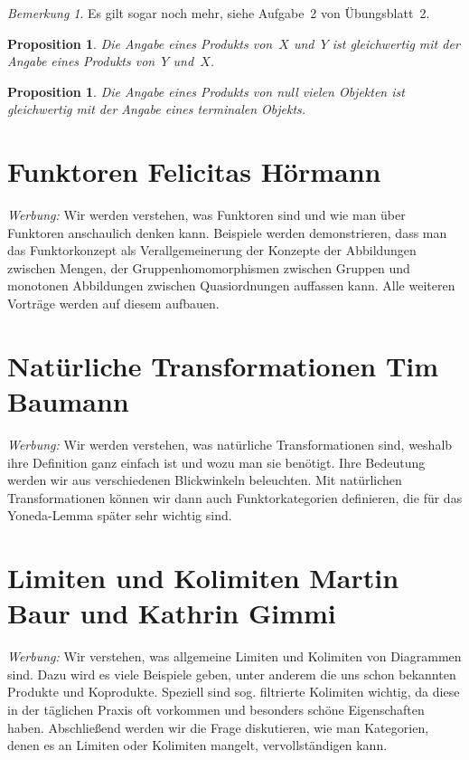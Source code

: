 \documentclass[a4paper,ngerman]{scrartcl}
\theoremstyle{definition}
\theoremstyle{plain}
\newtheorem{prop}[defn]{Proposition}
\theoremstyle{remark}
\newtheorem{bem}[defn]{Bemerkung}
\begin{document}
\begin{bem}Es gilt sogar noch mehr, siehe Aufgabe~2 von Übungsblatt~2.\end{bem}

\begin{prop}Die Angabe eines Produkts von~$X$ und~$Y$ ist gleichwertig mit der
Angabe eines Produkts von~$Y$ und~$X$.\end{prop}

\begin{prop}Die Angabe eines Produkts von null vielen Objekten ist gleichwertig
mit der Angabe eines terminalen Objekts.\end{prop}


\section[Funktoren]{Funktoren \hfill \small Felicitas Hörmann}

\emph{Werbung:} Wir werden verstehen, was Funktoren sind und wie man über
Funktoren anschaulich denken kann. Beispiele werden demonstrieren, dass
man das Funktorkonzept als Verallgemeinerung der Konzepte der Abbildungen
zwischen Mengen, der Gruppenhomomorphismen zwischen Gruppen und monotonen
Abbildungen zwischen Quasiordnungen auffassen kann. Alle weiteren Vorträge
werden auf diesem aufbauen.


\section[Natürliche Transformationen]{Natürliche Transformationen \hfill \small
Tim Baumann}

\emph{Werbung:} Wir werden verstehen, was natürliche Transformationen sind,
weshalb ihre Definition ganz einfach ist und wozu man sie benötigt. Ihre
Bedeutung werden wir aus verschiedenen Blickwinkeln beleuchten. Mit natürlichen
Transformationen können wir dann auch Funktorkategorien definieren, die für das
Yoneda-Lemma später sehr wichtig sind.


\section[Limiten und Kolimiten]{Limiten und Kolimiten \hfill \small
Martin Baur und Kathrin Gimmi}

\emph{Werbung:} Wir verstehen, was allgemeine Limiten und Kolimiten von
Diagrammen sind. Dazu wird es viele Beispiele geben, unter anderem die uns
schon bekannten Produkte und Koprodukte. Speziell sind sog. filtrierte
Kolimiten wichtig, da diese in der täglichen Praxis oft vorkommen und besonders
schöne Eigenschaften haben. Abschließend werden wir die Frage diskutieren, wie
man Kategorien, denen es an Limiten oder Kolimiten mangelt, vervollständigen
kann.
\end{document}
